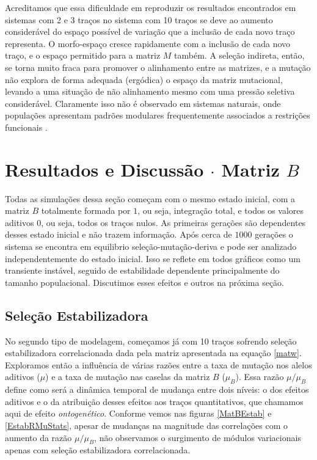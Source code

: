 Acreditamos que essa dificuldade em reproduzir os resultados encontrados
em sistemas com 2 e 3 traços no sistema com 10 traços se deve ao aumento
considerável do espaço possível de variação que a inclusão de cada novo
traço representa. 
O morfo-espaço cresce rapidamente com a inclusão de cada novo traço, e
o espaço permitido para a matriz $M$ também. 
A seleção indireta, então, se torna muito fraca para promover o
alinhamento entre as matrizes, e a mutação não explora de forma adequada
(ergódica) o espaço da matriz mutacional, levando a uma situação de não alinhamento
mesmo com uma pressão seletiva considerável. 
Claramente isso não é observado em sistemas naturais, onde populações
apresentam padrões modulares frequentemente associados a restrições
funcionais \citep{Porto2008}. 

\section{Resultados e Discussão $\cdot$ Matriz $B$}

Todas as simulações dessa seção começam com o mesmo estado inicial, com
a matriz $B$ totalmente formada por $1$, ou seja, integração total, e
todos os valores aditivos $0$, ou seja, todos os traços nulos. 
As primeiras gerações são dependentes desses estado inicial e não trazem
informação. 
Após cerca de $1000$ gerações o sistema se encontra em equilibrio
seleção-mutação-deriva e pode ser analizado independentemente do estado
inicial. 
Isso se reflete em todos gráficos como um transiente instável, seguido
de estabilidade dependente principalmente do tamanho populacional.
Discutimos esses efeitos e outros na próxima seção. 

\subsection{Seleção Estabilizadora}

No segundo tipo de modelagem, começamos já com 10 traços sofrendo
seleção estabilizadora correlacionada dada pela matriz apresentada na
equação \ref{matw}. 
Exploramos então a influência de várias razões entre a taxa de mutação
nos alelos aditivos ($\mu$) e a taxa de mutação nas caselas da matriz
$B$ ($\mu_B$). 
Essa razão $\mu/\mu_B$ define como será a dinâmica temporal de mudança
entre dois níveis: o dos efeitos aditivos e o da atribuição desses
efeitos aos traços quantitativos, que chamamos aqui de efeito {\it ontogenético}. 
Conforme vemos nas figuras \ref{MatBEstab} e \ref{EstabRMuStats}, apesar de mudanças na
magnitude das correlações com o aumento da razão $\mu/\mu_B$, não
observamos o surgimento de módulos variacionais apenas com seleção
estabilizadora correlacionada. 

